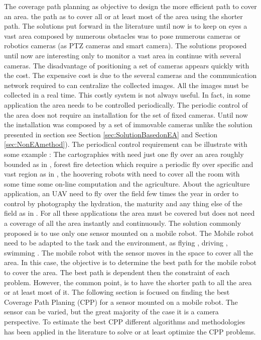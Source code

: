 The coverage path planning  as objective to design  the more efficient path to cover an area. the path as to cover all or  at least most of the area using  the shorter path. 
The solutions put forward in the literature until now is to keep on eyes a vast area composed by numerous obstacles was to pose numerous cameras or robotics cameras (as PTZ cameras and smart camera).
The solutions proposed until now are interesting only to monitor a vast area  in continue with several cameras. 
The disadvantage of positioning a set of cameras appears quickly with the cost. The expensive cost is due to the several cameras and the communication network required to can centralize the collected images. All the images must be collected in a real time. This costly system is not always useful. 
In fact, in some application the area needs to be controlled periodically. The periodic control of the area does not require an installation for the set of fixed cameras. Until now the installation was composed by a set of immovable cameras unlike the solution presented in section see Section \ref{sec:SolutionBasedonEA} and Section \ref{sec:NonEAmethod}).
 The periodical control requirement can be illustrate with some example :  The cartographies with need just one fly over an area roughly bounded as in \citep{66*galceran2013,164*valente2013}, forest fire detection which require a periodic fly over specific and vast region as in \cite{237*casbeer2006}, the hoovering robots with need to cover all the room with some time some on-line computation \citep{218*meiting2007,216*luo2002,215*lee2010,196*yang2004}  and the agriculture.
 About the agriculture application, an UAV need to fly over the field few times the year in order to control by photography the hydration, the maturity and any thing else of the field as in \citep{164*valente2013,203*zarco2008,63*chao2008,105*long199,167*barrientos2011,177*lelong2008}. %
For all these applications the area must be covered but does not need a coverage of all the area instantly and continuously. The solution commonly proposed is to use only one sensor mounted on a mobile robot. The Mobile robot need to be adapted to the task and the environment, as flying  \citep{105*long1991}, driving \citep{30*bodor2005,213*roberts2008}, swimming \cite{66*galceran2013}. The mobile robot with the sensor moves in the space to cover all the area. In this case, the objective is to determine the best path for the mobile robot to cover  the area. The best path is dependent then the constraint of each problem. However, the common point, is to have the shorter path to all the area or at least most of it.
The following section is focused on finding the best Coverage Path Planing (CPP) for a sensor mounted on a mobile robot. The sensor can be varied, but the great majority of the case it is a camera perspective. To estimate the best CPP different algorithms and methodologies has been applied in the literature to solve or at least optimize the CPP problems.

